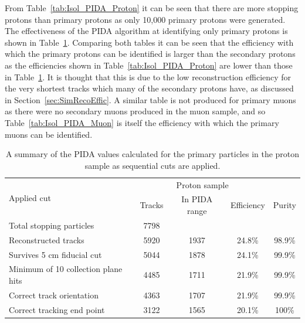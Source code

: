 From Table~\ref{tab:Isol_PIDA_Proton} it can be seen that there are more stopping protons than primary protons as only 10,000 primary protons were generated. The effectiveness of the PIDA algorithm at identifying only primary protons is shown in Table~\ref{tab:Isol_PIDA_PrimProton}. Comparing both tables it can be seen that the efficiency with which the primary protons can be identified is larger than the secondary protons as the efficiencies shown in Table~\ref{tab:Isol_PIDA_Proton} are lower than those in Table~\ref{tab:Isol_PIDA_PrimProton}. It is thought that this is due to the low reconstruction efficiency for the very shortest tracks which many of the secondary protons have, as discussed in Section~\ref{sec:SimRecoEffic}. A similar table is not produced for primary muons as there were no secondary muons produced in the muon sample, and so Table~\ref{tab:Isol_PIDA_Muon} is itself the efficiency with which the primary muons can be identified. \\ 

\begin{table}
  \caption[A summary of the PIDA values calculated for the primary particles in the proton sample as sequential cuts are applied]
          {A summary of the PIDA values calculated for the primary particles in the proton sample as sequential cuts are applied.}
  \centering
  \label{tab:Isol_PIDA_PrimProton}
  \begin{tabular}{l c c c c}
    \toprule
    \multirow{2}{*}{Applied cut} & \multicolumn{3}{c}{Proton sample} \\ 
    \cmidrule{2-5}
      & Tracks & In PIDA range & Efficiency & Purity \\ 
    \midrule
      Total stopping particles            & 7798 &      &        & \\

      Reconstructed tracks                & 5920 & 1937 & 24.8\% & 98.9\% \\

      Survives 5 cm fiducial cut          & 5044 & 1878 & 24.1\% & 99.9\% \\

      Minimum of 10 collection plane hits & 4485 & 1711 & 21.9\% & 99.9\% \\

      Correct track orientation           & 4363 & 1707 & 21.9\% & 99.9\% \\

      Correct tracking end point          & 3122 & 1565 & 20.1\% & 100\%  \\
    \bottomrule
  \end{tabular}
\end{table}

